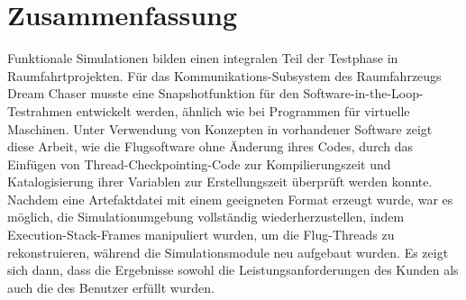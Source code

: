 \chapter*{Zusammenfassung}\label{cha:zusammenfassung}
Funktionale Simulationen bilden einen integralen Teil der Testphase in Raumfahrtprojekten. Für das Kommunikations-Subsystem des Raumfahrzeugs Dream Chaser musste eine Snapshotfunktion für den Software-in-the-Loop-Testrahmen entwickelt werden, ähnlich wie bei Programmen für virtuelle Maschinen. Unter Verwendung von Konzepten in vorhandener Software zeigt diese Arbeit, wie die Flugsoftware ohne Änderung ihres Codes, durch das Einfügen von Thread-Checkpointing-Code zur Kompilierungszeit und Katalogisierung ihrer Variablen zur Erstellungszeit überprüft werden konnte. Nachdem eine Artefaktdatei mit einem geeigneten Format erzeugt wurde, war es möglich, die Simulationumgebung vollständig wiederherzustellen, indem Execution-Stack-Frames manipuliert wurden, um die Flug-Threads zu rekonstruieren, während die Simulationsmodule neu aufgebaut wurden. Es zeigt sich dann, dass die Ergebnisse sowohl die Leistungsanforderungen des Kunden als auch die des Benutzer erfüllt wurden.